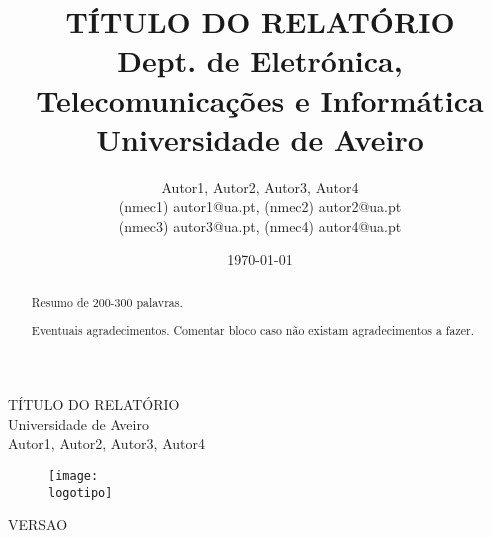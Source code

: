 \documentclass{report}
\begin{document}
%
\def\titulo{TÍTULO DO RELATÓRIO}
\def\data{DATA}
\def\autores{Autor1, Autor2, Autor3, Autor4}
\def\autorescontactos{(nmec1) autor1@ua.pt, (nmec2) autor2@ua.pt\\(nmec3) autor3@ua.pt, (nmec4) autor4@ua.pt}
\def\versao{VERSAO}
\def\departamento{Dept. de Eletrónica, Telecomunicações e Informática}
\def\empresa{Universidade de Aveiro}
\def\logotipo{ua.pdf}
%
%
\begin{titlepage}

\begin{center}
%
\vspace*{50mm}
%
{\Huge \titulo}\\ 
%
\vspace{10mm}
%
{\Large \empresa}\\
%
\vspace{10mm}
%
{\LARGE \autores}\\ 
%
\vspace{30mm}
%
\begin{figure}[h]
\center
\texttt{[image: \\logotipo]}
\end{figure}
%
\vspace{30mm}
\end{center}
%
\begin{flushright}
\versao
\end{flushright}
\end{titlepage}

\title{%
{\Huge\textbf{\titulo}}\\
{\Large \departamento\\ \empresa}
}
%
\author{%
    \autores \\
    \autorescontactos
}
%
\date{\today}
%
\maketitle


\begin{abstract}
Resumo de 200-300 palavras.
\end{abstract}

\renewcommand{\abstractname}{Agradecimentos}
\begin{abstract}
Eventuais agradecimentos.
Comentar bloco caso não existam agradecimentos a fazer.
\end{abstract}
\end{document}
